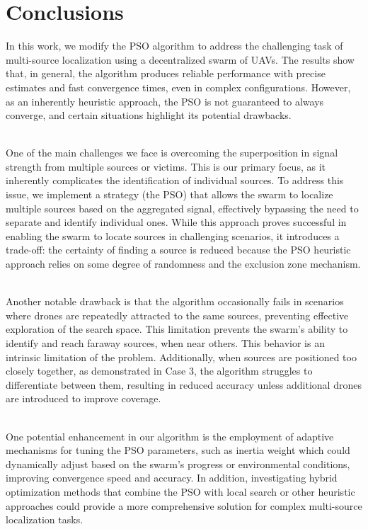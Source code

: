 \documentclass[main]{subfiles}
\begin{document}
\section{Conclusions}
In this work, we modify the PSO algorithm to address the challenging
task of multi-source localization using a decentralized swarm of UAVs.
The results show that, in general, the algorithm produces reliable
performance with precise estimates and fast convergence times, even in
complex configurations. However, as an inherently heuristic approach,
the PSO is not guaranteed to always converge, and certain situations
highlight its potential drawbacks.

\noindent\\
One of the main challenges we face is overcoming the superposition in
signal strength from multiple sources or victims. This is our primary
focus, as it inherently complicates the identification of individual
sources. To address this issue, we implement a strategy (the PSO) that
allows the swarm to localize multiple sources based on the aggregated
signal, effectively bypassing the need to separate and identify
individual ones. While this approach proves successful in enabling the
swarm to locate sources in challenging scenarios, it introduces a
trade-off: the certainty of finding a source is reduced because the PSO
heuristic approach relies on some degree of randomness and the exclusion
zone mechanism.

\noindent\\
Another notable drawback is that the algorithm occasionally fails in
scenarios where drones are repeatedly attracted to the same sources,
preventing effective exploration of the search space. This limitation
prevents the swarm's ability to identify and reach faraway
sources, when near others. This behavior is an intrinsic limitation of 
the problem. Additionally, when sources
are positioned too closely together, as demonstrated in Case 3, the
algorithm struggles to differentiate between them, resulting in reduced
accuracy unless additional drones are introduced to improve coverage.

\noindent\\
One potential enhancement in our algorithm is the employment of adaptive mechanisms 
for tuning the PSO parameters, such as inertia weight 
which could dynamically adjust based on the swarm's progress or environmental 
conditions, improving convergence speed and accuracy.
In addition, investigating hybrid optimization methods that combine 
the PSO with local search or other heuristic approaches could provide a more 
comprehensive solution for complex multi-source localization tasks.
\end{document}
